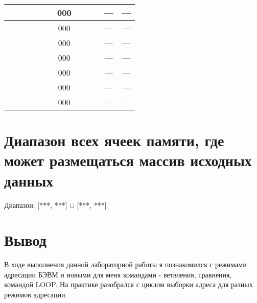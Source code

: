 \begin{flushleft}
\begin{tabular}{|c|c|c|c|c|c|c|c|c|c|c|c|}
&  &  &  &  &  & 000 &  &  &  & --- & ---	 \\\hline

&  &  &  &  &  & 000 &  &  &  & --- & ---	 \\\hline

&  &  &  &  &  & 000 &  &  &  & --- & ---	 \\\hline

&  &  &  &  &  & 000 &  &  &  & --- & ---	 \\\hline

&  &  &  &  &  & 000 &  &  &  & --- & ---	 \\\hline

&  &  &  &  &  & 000 &  &  &  & --- & ---	 \\\hline

&  &  &  &  &  & 000 &  &  &  & --- & ---	 \\\hline
\end{tabular}
\end{flushleft}

\section{Диапазон всех ячеек памяти, где может размещаться массив исходных данных}
Диапазон: [***, ***] $\cup$ [***, ***]

\section{Вывод}
В ходе выполнения данной лабораторной работы я познакомился с режимами адресации БЭВМ и новыми для меня командами - ветвления, сравнения, командой LOOP. На практике разобрался с циклом выборки адреса для разных режимов адресации.
